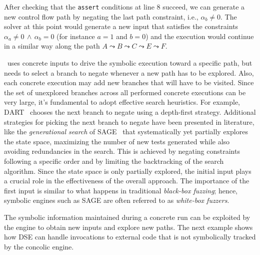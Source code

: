 After checking that the \texttt{assert} conditions at line 8 succeed, we can generate a new control flow path by negating the last path constraint, i.e., $\alpha_b\neq 0$. The solver at this point would generate a new input that satisfies the constraints $\alpha_a\neq 0\,\wedge\, \alpha_b=0$ (for instance $a = 1$ and $b = 0$) and the execution would continue in a similar way along the path $A\leadsto B\leadsto C\leadsto E\leadsto F$. %


\vspace{+10pt}
\dse\ uses concrete inputs to drive the symbolic execution toward a specific path, but needs to select a branch to negate whenever a new path has to be explored. Also, each concrete execution may add new branches that will have to be visited. Since the set of unexplored branches across all performed concrete executions can be very large, it's fundamental to adopt effective search heuristics. For example, {\textsc DART}~\cite{DART-PLDI05} chooses the next branch to negate using a depth-first strategy. 
Additional strategies for picking the next branch to negate have been presented in literature, like the {\em generational search} of {\textsc SAGE}~\cite{SAGE-NDSS08} that systematically yet partially explores the state space, maximizing the number of new tests generated while also avoiding redundancies in the search. This is achieved by negating constraints following a specific order and by limiting the backtracking of the search algorithm. Since the state space is only partially explored, the initial input plays a crucial role in the effectiveness of the overall approach.  The importance of the first input is similar to what happens in traditional {\em black-box fuzzing}; hence, symbolic engines such as {\textsc SAGE} are often referred to as {\em white-box fuzzers}.

The symbolic information maintained during a concrete run can be exploited by the engine to obtain new inputs and explore new paths. The next example shows how DSE can handle invocations to external code that is not symbolically tracked by the concolic engine.

